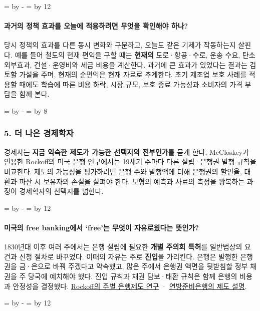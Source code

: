 \documentclass[10pt,a4paper]{article}
\newcommand{\ReserveQuestionSpace}{%
  \par\begingroup
  \dimen0=\pagegoal \advance\dimen0 by -\pagetotal
  \dimen2=\baselineskip \multiply\dimen2 by 12
  \ifdim\dimen0<\dimen2 \newpage\fi
  \endgroup}
\newcommand{\ReserveReadingSectionSpace}{%
  \par\begingroup
  \dimen0=\pagegoal \advance\dimen0 by -\pagetotal
  \dimen2=\baselineskip \multiply\dimen2 by 8
  \ifdim\dimen0<\dimen2 \newpage\fi
  \endgroup}
\begin{document}
\ReserveQuestionSpace
\paragraph{과거의 정책 효과를 오늘에 적용하려면 무엇을 확인해야 하나?}
당시 정책의 효과를 다른 동시 변화와 구분하고, 오늘도 같은 기제가 작동하는지 살핀다. 예를 들어 철도의 현재 편익을 구할 때는 \textbf{현재의} 도로·항공·수로, 운송 수요, 탄소 외부효과, 건설·운영비와 세금 비용을 계산한다. 과거에 큰 효과가 있었다는 결과는 검토할 가설을 주며, 현재의 순편익은 현재 자료로 추계한다. 초기 제조업 보호 사례를 적용할 때에도 학습에 따른 비용 하락, 시장 규모, 보호 종료 가능성과 소비자의 가격 부담을 함께 본다.\par

\ReserveReadingSectionSpace
\subsubsection*{5. 더 나은 경제학자}

경제사는 \textbf{지금 익숙한 제도가 가능한 선택지의 전부인가}를 묻게 한다. McCloskey가 인용한 Rockoff의 미국 은행 연구에서는 19세기 주마다 다른 설립·은행권 발행 규칙을 비교한다. 제도의 가능성을 평가하려면 은행 수와 발행액에 더해 은행권의 할인율, 태환과 파산 시 보유자의 손실을 살펴야 한다. 모형의 예측과 사료의 측정을 왕복하는 과정이 경제학자의 선택지를 넓힌다.\par

\ReserveQuestionSpace
\paragraph{미국의 free banking에서 ‘free’는 무엇이 자유로웠다는 뜻인가?}
1830년대 이후 여러 주에서는 은행 설립에 필요한 \textbf{개별 주의회 특허}를 일반법상의 요건과 신청 절차로 바꾸었다. 이때의 자유는 주로 \textbf{진입}을 가리킨다. 은행은 발행한 은행권을 금·은으로 바꿔 주겠다고 약속했고, 많은 주에서 은행권 액면을 뒷받침할 정부 채권을 주 당국에 예치해야 했다. 진입 규칙과 채권 담보·태환 규칙은 함께 은행의 비용과 안정성을 결정했다. \href{https://legacy.voteview.com/pdf/Rockoff\_1975\_Banking\_1840-1860.pdf}{Rockoff의 주별 은행제도 연구} · \href{https://www.minneapolisfed.org/about-us/our-history/history-of-central-banking}{연방준비은행의 제도 설명}.\par

\ReserveQuestionSpace
\end{document}
